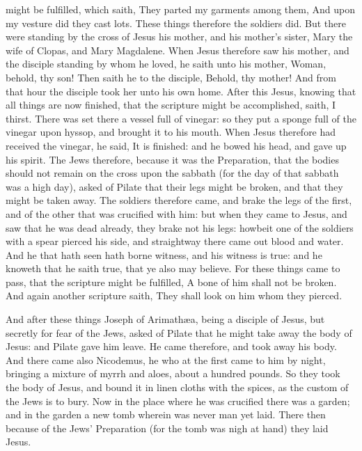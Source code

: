 might be fulfilled, which saith, They parted my garments among them, And upon my vesture did they cast lots.  These things therefore the soldiers did. But there were standing by the cross of Jesus his mother, and his mother’s sister, Mary the wife of Clopas, and Mary Magdalene. When Jesus therefore saw his mother, and the disciple standing by whom he loved, he saith unto his mother, Woman, behold, thy son! Then saith he to the disciple, Behold, thy mother! And from that hour the disciple took her unto his own home.  After this Jesus, knowing that all things are now finished, that the scripture might be accomplished, saith, I thirst. There was set there a vessel full of vinegar: so they put a sponge full of the vinegar upon hyssop, and brought it to his mouth. When Jesus therefore had received the vinegar, he said, It is finished: and he bowed his head, and gave up his spirit.  The Jews therefore, because it was the Preparation, that the bodies should not remain on the cross upon the sabbath (for the day of that sabbath was a high day), asked of Pilate that their legs might be broken, and that they might be taken away. The soldiers therefore came, and brake the legs of the first, and of the other that was crucified with him: but when they came to Jesus, and saw that he was dead already, they brake not his legs: howbeit one of the soldiers with a spear pierced his side, and straightway there came out blood and water. And he that hath seen hath borne witness, and his witness is true: and he knoweth that he saith true, that ye also may believe. For these things came to pass, that the scripture might be fulfilled, A bone of him shall not be broken. And again another scripture saith, They shall look on him whom they pierced.  

And after these things Joseph of Arimathæa, being a disciple of Jesus, but secretly for fear of the Jews, asked of Pilate that he might take away the body of Jesus: and Pilate gave him leave. He came therefore, and took away his body. And there came also Nicodemus, he who at the first came to him by night, bringing a mixture of myrrh and aloes, about a hundred pounds. So they took the body of Jesus, and bound it in linen cloths with the spices, as the custom of the Jews is to bury. Now in the place where he was crucified there was a garden; and in the garden a new tomb wherein was never man yet laid. There then because of the Jews’ Preparation (for the tomb was nigh at hand) they laid Jesus. 

